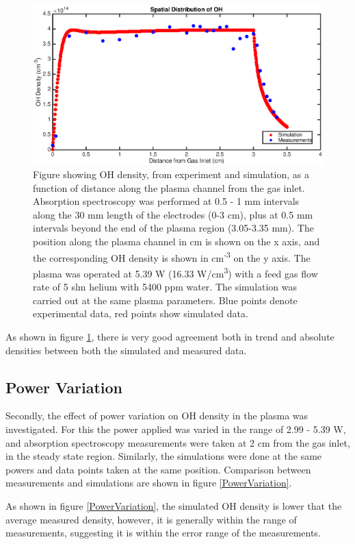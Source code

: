 \documentclass[11pt, oneside]{article}   	%
\begin{document}
\begin{figure}
\includegraphics[width=\textwidth]{Figures/SpatialGraph}
\caption{
Figure showing OH density, from experiment and simulation, as a function of distance along the plasma channel from the gas inlet. Absorption spectroscopy was performed at 0.5 - 1 mm intervals along the 30 mm length of the electrodes (0-3 cm), plus at 0.5 mm intervals beyond the end of the plasma region (3.05-3.35 mm). The position along the plasma channel in cm is shown on the x axis, and the corresponding OH density is shown in cm\textsuperscript{-3} on the y axis. The plasma was operated at 5.39 W (16.33 W/cm\textsuperscript{3}) with a feed gas flow rate of 5 slm helium with 5400 ppm water. 
The simulation was carried out at the same plasma parameters.
Blue points denote experimental data, red points show simulated data.}
\label{SpatialGraph}
\end{figure}

As shown in figure \ref{SpatialGraph}, there is very good agreement both in trend and absolute densities between both the simulated and measured data.

\subsection{Power Variation}

Secondly, the effect of power variation on OH density in the plasma was investigated.
For this the power applied was varied in the range of 2.99 - 5.39 W, and absorption spectroscopy measurements were taken at 2 cm from the gas inlet, in the steady state region.
Similarly, the simulations were done at the same powers and data points taken at the same position.
Comparison between measurements and simulations are shown in figure \ref{PowerVariation}.

As shown in figure \ref{PowerVariation}, the simulated OH density is lower that the average measured density, however, it is generally within the range of measurements, suggesting it is within the error range of the measurements.
\end{document}
